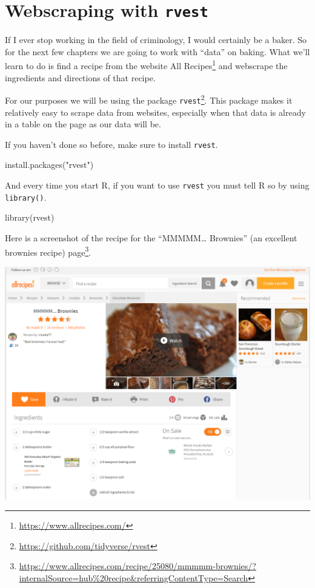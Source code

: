 \documentclass[
]{krantz}
\makeatletter
\newenvironment{Shaded}{\begin{snugshade}}{\end{snugshade}}
\newcommand{\FunctionTok}[1]{\textcolor[rgb]{0,0,0}{#1}}
\newcommand{\NormalTok}[1]{#1}
\newcommand{\StringTok}[1]{\textcolor[rgb]{0.5,0.5,0.5}{#1}}
\renewcommand{\href}[2]{#2\footnote{\url{#1}}}
\newenvironment{kframe}{%
\medskip{}
\setlength{\fboxsep}{.8em}
 \def\at@end@of@kframe{}%
 \ifinner\ifhmode%
  \def\at@end@of@kframe{\end{minipage}}%
  \begin{minipage}{\columnwidth}%
 \fi\fi%
 \def\FrameCommand##1{\hskip\@totalleftmargin \hskip-\fboxsep
 \colorbox{shadecolor}{##1}\hskip-\fboxsep
     \hskip-\linewidth \hskip-\@totalleftmargin \hskip\columnwidth}%
 \MakeFramed {\advance\hsize-\width
   \@totalleftmargin\z@ \linewidth\hsize
   \@setminipage}}%
 {\par\unskip\endMakeFramed%
 \at@end@of@kframe}
\renewenvironment{Shaded}{\begin{kframe}}{\end{kframe}}
\makeatother
\begin{document}
\hypertarget{webscraping-with-rvest}{%
\chapter{\texorpdfstring{Webscraping with \texttt{rvest}}{Webscraping with rvest}}\label{webscraping-with-rvest}}

If I ever stop working in the field of criminology, I would certainly be a baker. So for the next few chapters we are going to work with ``data'' on baking. What we'll learn to do is find a recipe from the website \href{https://www.allrecipes.com/}{All Recipes} and webscrape the ingredients and directions of that recipe.

For our purposes we will be using the package \href{https://github.com/tidyverse/rvest}{\texttt{rvest}}. This package makes it relatively easy to scrape data from websites, especially when that data is already in a table on the page as our data will be.

If you haven't done so before, make sure to install \texttt{rvest}.

\begin{Shaded}
\begin{Highlighting}[]
\FunctionTok{install.packages}\NormalTok{(}\StringTok{"rvest"}\NormalTok{)}
\end{Highlighting}
\end{Shaded}

And every time you start R, if you want to use \texttt{rvest} you must tell R so by using \texttt{library()}.

\begin{Shaded}
\begin{Highlighting}[]
\FunctionTok{library}\NormalTok{(rvest)}
\end{Highlighting}
\end{Shaded}

Here is a screenshot of the recipe for the ``MMMMM\ldots{} Brownies'' (an excellent brownies recipe) \href{https://www.allrecipes.com/recipe/25080/mmmmm-brownies/?internalSource=hub\%20recipe\&referringContentType=Search}{page}.

\includegraphics{images/brownies_1.PNG}
\end{document}
